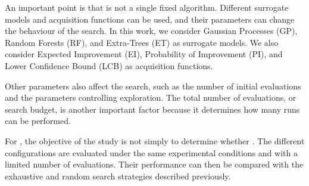 An important point is that  is not a single fixed
algorithm. Different surrogate models and acquisition functions can be
used, and their parameters can change the behaviour of the search. In
this work, we consider Gaussian Processes (GP), Random Forests (RF), and
Extra-Trees (ET) as surrogate models. We also consider Expected
Improvement (EI), Probability of Improvement (PI), and Lower Confidence
Bound (LCB) as acquisition functions.

Other parameters also affect the search, such as the number of initial
evaluations and the parameters controlling exploration. The total number
of evaluations, or search budget, is another important factor because it
determines how many  runs can be performed.

For , the objective of the study is
not simply to determine whether .  The different  configurations are evaluated
under the same experimental conditions and with a limited number of
evaluations. Their performance can then be compared with the exhaustive
and random search strategies described previously.
